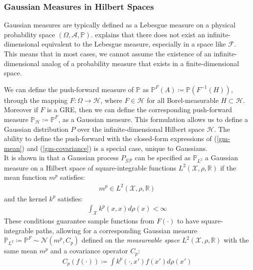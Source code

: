 \documentclass{article}
\newcommand{\GP}{\operatorname{\mathcal{GP}}}
\numberwithin{equation}{section}
\begin{document}
\subsubsection{Gaussian Measures in Hilbert Spaces}
Gaussian measures are typically defined as a Lebesgue measure on a physical probability space $(\Omega, \mathcal{A}, \mathbb{P})$. \cite{matthews2016sparse} explains that there does not exist an infinite-dimensional equivalent to the Lebesgue measure, especially in a space like $\mathcal{F}$. This means that in most cases, we cannot assume the existence of an infinite-dimensional analog of a probability measure that exists in a finite-dimensional space. 

We can define the push-forward measure of $\mathbb{P}$ as $\mathbb{P}^{F}(A) \coloneqq \mathbb{P}(F^{-1}(H))$, through the mapping $F: \Omega \rightarrow \mathcal{H}$, where $F \in \mathcal{H}$ for all Borel-measurable $H \subset \mathcal{H}$. Moreover if $F$ is a GRE, then we can define the corresponding push-forward measure $\mathbb{P}_{\mathcal{H}} \coloneqq \mathbb{P}^{F}$, as a Gaussian measure. This formulation allows us to define a Gaussian distribution $P$ over the infinite-dimensional Hilbert space $\mathcal{H}$. The ability to define the push-forward with the closed-form expressions of (\ref{gm-mean}) and (\ref{gm-covariance}) is a special case, unique to Gaussians.
\newline
\\It is shown in \cite{wild2022generalized} that a Gaussian process $P_{\GP}$ can be specified as $\mathbb{P}_{L^2}$ a Gaussian measure on a Hilbert space of square-integrable functions $L^2(\mathcal{X}, \rho, \mathbb{R})$ if the mean function $m^p$ satisfies:
\begin{align}
    \label{smooth-mean-function-condition}
    m^p \in L^2(\mathcal{X}, \rho, \mathbb{R})
\end{align}
and the kernel $k^p$ satisfies:
\begin{align}
    \int_{\mathcal{X}} k^p(x, x) d\rho(x) < \infty
    \label{trace-kernel-condition}
\end{align}
These conditions guarantee sample functions from $F(\cdot)$ to have square-integrable paths, allowing for a corresponding Gaussian measure $\mathbb{P}_{L^2} \coloneqq \mathbb{P}^F \sim \mathcal{N}(m^p, C_p)$ defined on the \textit{measureable space} $L^2(\mathcal{X}, \rho, \mathbb{R})$ with the same mean $m^p$ and a covariance operator $C_p$:
\begin{align}
    C_p(f(\cdot)) \coloneqq \int k^p(\cdot, x')f(x')d \rho(x')
    \label{gm-covariance-operator}
\end{align}
\end{document}
